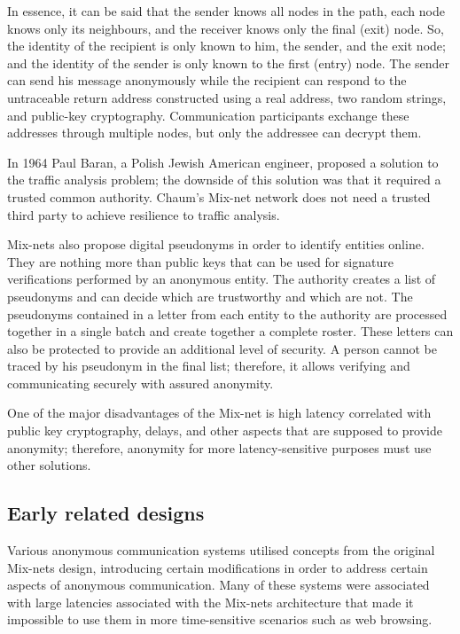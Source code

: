 In essence, it can be said that the sender knows all nodes in the path, each node knows only its neighbours, and the receiver knows only the final (exit) node. So, the identity of the recipient is only known to him, the sender, and the exit node; and the identity of the sender is only known to the first (entry) node.
The sender can send his message anonymously while the recipient can respond to the untraceable return address constructed using a real address, two random strings, and public-key cryptography. Communication participants exchange these addresses through multiple nodes, but only the addressee can decrypt them.

In 1964 \cite{Baran1964} Paul Baran, a Polish Jewish American engineer, proposed a solution to the traffic analysis problem; the downside of this solution was that it required a trusted common authority. Chaum's Mix-net network does not need a trusted third party to achieve resilience to traffic analysis. 

Mix-nets also propose digital pseudonyms in order to identify entities online. They are nothing more than public keys that can be used for signature verifications performed by an anonymous entity. The authority creates a list of pseudonyms and can decide which are trustworthy and which are not. The pseudonyms contained in a letter from each entity to the authority are processed together in a single batch and create together a complete roster. These letters can also be protected to provide an additional level of security. A person cannot be traced by his pseudonym in the final list; therefore, it allows verifying and communicating securely with assured anonymity. 

One of the major disadvantages of the Mix-net is high latency correlated with public key cryptography, delays, and other aspects that are supposed to provide anonymity; therefore, anonymity for more latency-sensitive purposes must use other solutions.

\subsection{Early related designs}
Various anonymous communication systems utilised concepts from the original Mix-nets design, introducing certain modifications in order to address certain aspects of anonymous communication.
Many of these systems were associated with large latencies associated with the Mix-nets architecture that made it impossible to use them in more time-sensitive scenarios such as web browsing.

